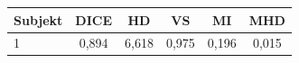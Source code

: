 \begin{tabular}{l c c c c c}
 \hline
Subjekt & DICE & HD & VS & MI & MHD \\ \hline
1 & 0,894 & 6,618 & 0,975 & 0,196 & 0,015 \\
\hline 
 \end{tabular}
